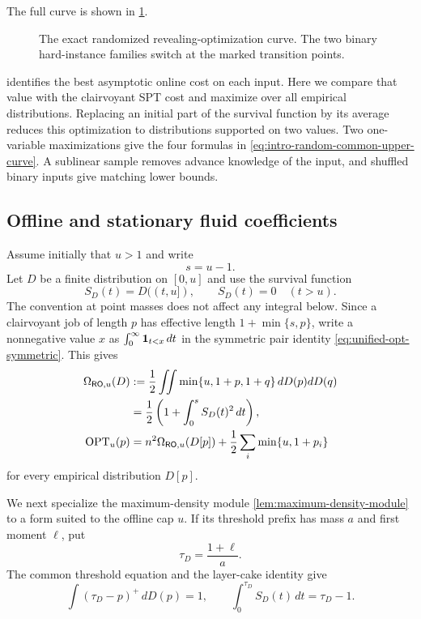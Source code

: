The full curve is shown in \cref{fig:randomized-revealing-curve}.

\begin{figure}[htbp]
\centering

\caption{The exact randomized revealing-optimization curve.  The two
binary hard-instance families switch at the marked transition points.}
\label{fig:randomized-revealing-curve}
\end{figure}

 identifies the best asymptotic online cost
on each input.  Here we compare that value with the clairvoyant SPT cost and
maximize over all empirical distributions.  Replacing an initial part of the
survival function by its average reduces this optimization to distributions
supported on two values.  Two one-variable maximizations give the four
formulas in \cref{eq:intro-random-common-upper-curve}.  A sublinear sample
removes advance knowledge of the input,
and shuffled binary inputs give matching lower bounds.

\subsection{Offline and stationary fluid coefficients}

Assume initially that $u>1$ and write
\begin{equation}
 s=u-1.
 \label{eq:rcu-s}
\end{equation}
Let $D$ be a finite distribution on $[0,u]$ and use the survival function
\begin{equation}
 S_D(t)=D((t,u]),
 \qquad S_D(t)=0\quad(t>u).
 \label{eq:rcu-survival}
\end{equation}
The convention at point masses does not affect any integral below.  Since a
clairvoyant job of length $p$ has effective length $1+\min\{s,p\}$, write a
nonnegative value $x$ as $\int_0^\infty\mathbf{1}_{t<x}\,dt$ in the symmetric pair
identity \cref{eq:unified-opt-symmetric}.  This gives
\begin{align}
 \Omega_{\mathsf{RO},u}(D)
 &\mathrel{:=}\frac12\iint
       \min\{u,1+p,1+q\}\,dD(p)dD(q)\notag\\
 &=\frac12\left(1+\int_0^s S_D(t)^2\,dt\right),
 \label{eq:rcu-offline-fluid}\\
 \operatorname{OPT}_u(p)
 &=n^2\Omega_{\mathsf{RO},u}(D[p])
   +\frac12\sum_i\min\{u,1+p_i\}
 \label{eq:rcu-offline-finite}
\end{align}
for every empirical distribution $D[p]$.

We next specialize the maximum-density module
\cref{lem:maximum-density-module} to a form suited to the offline cap $u$.
If its
threshold prefix has mass $a$ and first moment $\ell$, put
\begin{equation}
 \tau_D=\frac{1+\ell}{a}.
 \label{eq:rcu-tau-density}
\end{equation}
The common threshold equation and the layer-cake identity give
\begin{equation}
 \int(\tau_D-p)^+\,dD(p)=1,
 \qquad
 \int_0^{\tau_D} S_D(t)\,dt=\tau_D-1.
 \label{eq:rcu-threshold-equation}
\end{equation}

